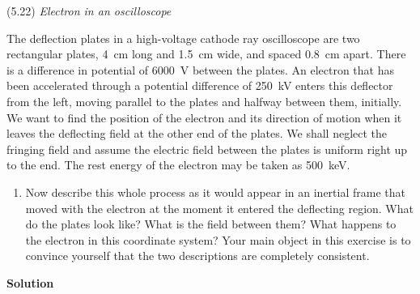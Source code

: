 \documentclass{article}
\begin{document}
\begin{homeworkProblem}
	(5.22) \textit{Electron in an oscilloscope}

	The deflection plates in a high-voltage cathode ray oscilloscope are two rectangular plates, \SI{4}{\cm} long and \SI{1.5}{\cm} wide, and spaced \SI{0.8}{\cm} apart. There is a difference in potential of \SI{6000}{\volt} between the plates. An electron that has been accelerated through a potential difference of \SI{250}{\kilo\volt} enters this deflector from the left, moving parallel to the plates and halfway between them, initially. We want to find the position of the electron and its direction of motion when it leaves the deflecting field at the other end of the plates. We shall neglect the fringing field and assume the electric field between the plates is uniform right up to the end. The rest energy of the electron may be taken as \SI{500}{\kilo\electronvolt}.
	\begin{enumerate}[label=(\alph*)]
		\begin{item}
			First carry out the analysis in the lab frame by answering the following questions:
			\begin{itemize}
				\item What are the values of $\gamma$ and $\beta$?
				\item What is $p_x$ in units of $mc$?
				\item How long does the electron spend between the plates? (Neglect the change in horizontal velocity discussed in Exercise 5.25.)
				\item What is the transverse momentum component acquired, in units of $mc$?
				\item What is the transverse velocity at exit?
				\item What is the vertical position at exit?
				\item What is the direction of flight at exit?
			\end{itemize}
		\end{item}
		\item Now describe this whole process as it would appear in an inertial frame that moved with the electron at the moment it entered the deflecting region. What do the plates look like? What is the field between them? What happens to the electron in this coordinate system? Your main object in this exercise is to convince yourself that the two descriptions are completely consistent.
	\end{enumerate}

	\textbf{Solution}


\end{homeworkProblem}
\end{document}
